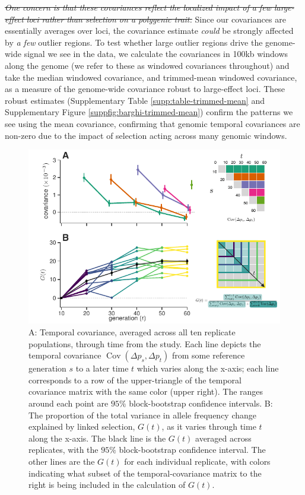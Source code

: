 \documentclass[11pt]{article}
\newcommand{\vb}[1]{{\it \color{blue} #1}}
\newcommand{\vbout}[1]{{\it \color{blue} \sout{#1}}}
\DeclareMathOperator{\cov}{Cov}
\begin{document}
\vbout{One concern is that these covariances reflect the localized impact of a
  few large-effect loci rather than selection on a polygenic trait.} Since our
  covariances are essentially averages over loci, the covariance estimate \vb{could}
  be strongly affected by \vb{a few} outlier regions. To test whether large
  outlier regions drive the genome-wide signal we see in the
  \textcite{Barghi2019-qy} data, we calculate the covariances in 100kb windows
  along the genome (we refer to these as windowed covariances throughout) and
  take the median windowed covariance, and trimmed-mean windowed covariance, as
  a measure of the genome-wide covariance robust to large-effect loci. These
  robust estimates (Supplementary Table \ref{supp:table-trimmed-mean} and
  Supplementary Figure \ref{suppfig:barghi-trimmed-mean}) confirm the patterns
  we see using the mean covariance, confirming that genomic temporal
  covariances are non-zero due to the impact of selection acting across many
  genomic windows. 


\begin{figure}[!htb]
  \centering
  \includegraphics[width=\textwidth]{figures/figure-1-revision.pdf}

  \caption{A: Temporal covariance, averaged across all ten replicate
    populations, through time from the \textcite{Barghi2019-qy} study. Each
    line depicts the temporal covariance $\cov(\Delta p_s, \Delta p_t)$ from
    some reference generation $s$ to a later time $t$ which varies along the
    x-axis; each line corresponds to a row of the upper-triangle of the
    temporal covariance matrix with the same color (upper right). The ranges
    around each point are $95\%$ block-bootstrap confidence intervals. B: The
    proportion of the total variance in allele frequency change explained by
    linked selection, $G(t)$, as it varies through time $t$ along the x-axis.
    The black line is the $G(t)$ averaged across replicates, with the $95\%$
    block-bootstrap confidence interval. The other lines are the $G(t)$ for
    each individual replicate, with colors indicating what subset of the
    temporal-covariance matrix to the right is being included in the
  calculation of $G(t)$.}

  \label{fig:figure-1}
\end{figure}
\end{document}
